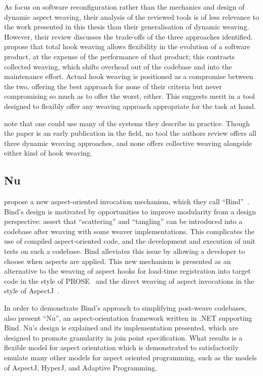 As \citeauthor{dynamicAOchitchyan} focus on software reconfiguration rather than
the mechanics and design of dynamic aspect weaving, their analysis of the
reviewed tools is of less relevance to the work presented in this thesis than
their generalisation of dynamic weaving. However, their review discusses the
trade-offs of the three approaches identified. \citeauthor{dynamicAOchitchyan}
propose that total hook weaving allows flexibility in the evolution of a
software product, at the expense of the performance of that product; this
contrasts collected weaving, which shifts overhead out of the codebase and into
the maintenance effort. Actual hook weaving is positioned as a compromise
between the two, offering the best approach for none of their criteria but never
compromising so much as to offer the worst, either. This suggests merit in a
tool designed to flexibly offer any weaving approach appropriate for the task at
hand.

\citeauthor{dynamicAOchitchyan} note that one could use many of
the systems they describe in practice. Though the paper is an early publication
in the field, no tool the authors review offers all three dynamic weaving
approaches, and none offers collective weaving alongside either kind of hook
weaving.


\subsection{Nu}

\citeauthor{rajan2006nu_towardsao_invocation} propose a new aspect-oriented
invocation mechanism, which they call
``Bind''~\cite{rajan2006nu_towardsao_invocation}. Bind's design is motivated by
opportunities to improve modularity from a design perspective:
\citeauthor{rajan2006nu_towardsao_invocation} assert that ``scattering'' and
``tangling'' can be introduced into a codebase after weaving with some weaver
implementations. This complicates the use of compiled aspect-oriented code, and
the development and execution of unit tests on such a codebase. Bind alleviates
this issue by allowing a developer to choose when aspects are applied. This new
mechanism is presented as an alternative to the weaving of aspect hooks for
load-time registration into target code in the style of
PROSE~\cite{popovici2002PROSE,popovici2003JITaspects} and the direct weaving of
aspect invocations in the style of AspectJ~\cite{aspectj_intro}.

In order to demonstrate Bind's approach to simplifying post-weave codebases,
\citeauthor{rajan2006_towardsao_invocation} also present ``Nu'', an
aspect-orientation framework written in .NET supporting Bind. Nu's design is
explained and its implementation presented, which are designed to promote
granularity in join point specification. What results is a flexible model for
aspect orientation which is demonstrated to satisfactorily emulate many other
models for aspect oriented programming, such as the models of AspectJ, HyperJ,
and Adaptive Programming.


